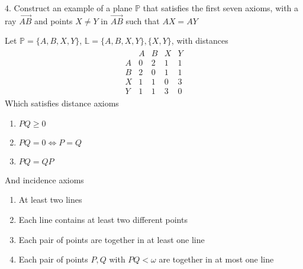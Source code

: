 \documentclass{report}
\begin{document}
    \bigbreak \noindent 
    \begin{mdframed}
        4. Construct an example of a plane $\mathbb{P}$ that satisfies the first seven axioms, with a ray $\overrightarrow{AB}$ and points $X\ne  Y $ in $\overrightarrow{AB} $ such that $AX = AY $
    \end{mdframed}
    \bigbreak \noindent 
    Let $\mathbb{P} = \{A,B,X,Y\}$, $\mathbb{L} = \{A,B,X,Y\}, \{X,Y\}$, with distances
    \begin{align*}
        \begin{array}{c|cccc}
           &A&B&X&Y \\
            A & 0 & 2 & 1 & 1  \\ 
            B &  2  & 0 & 1 & 1 \\
            X &  1 & 1& 0 & 3 \\
            Y & 1 & 1& 3 & 0
        \end{array}
    \end{align*}
    Which satisfies distance axioms
    \begin{enumerate}
        \item $PQ \geq 0 $
        \item $PQ = 0 \iff P = Q $
        \item $PQ = QP $
    \end{enumerate}
    And incidence axioms
    \begin{enumerate}[label=(\alph*)]
        \item At least two lines
        \item Each line contains at least two different points
        \item Each pair of points are together in at least one line
        \item Each pair of points $P,Q$ with $PQ < \omega$ are together in at most one line
    \end{enumerate}
\end{document}

